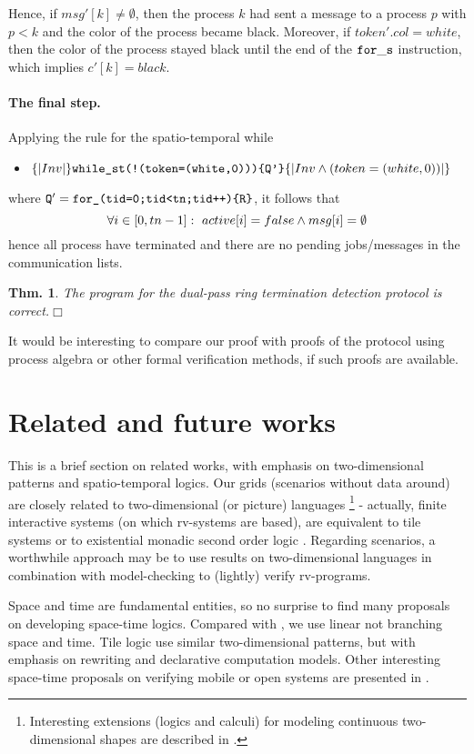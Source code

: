\documentclass[runningheads]{llncs}
\newcommand{\1}{\u{a}}
\newcommand{\2}{\c{s}}
\newcommand{\5}{\c{t}}
\newcommand{\8}{\^{\i}}
\newcommand{\9}{\^{a}}
\newtheorem{theorem}{Theorem}[section]
\newtheorem{theorem}{Thm.}[section]
\newcommand{\bthm}{\begin{theorem}}
\newcommand{\ethm}{\end{theorem}}
\newcommand{\snvsp}{\vspace{-1ex}}
\newcommand{\bi}{\begin{itemize}}
\newcommand{\ei}{\end{itemize}}
\newcommand{\foo}[1]{\footnote{#1}}
\newcommand{\co}{\,\colon\;}
\begin{document}
Hence, if $msg'[k]\not=\emptyset$, then the process $k$ had sent a message to a process $p$ with $p<k$ and the
color of the process became black. Moreover, if $token'.col=white$, then the color of the process stayed black
until the end of the ${\tt for\_s}$ instruction, which implies $c'[k]=black$.

\paragraph{The final step.}

Applying the rule for the spatio-temporal while \snvsp\bi
\item[]$\{|Inv|\}\mbox{\tt while\_st(!(token=(white,0)))\{Q'\}}\{|Inv \wedge (token=(white,0))|\}$\snvsp\ei
where ${\tt Q'= \mbox{\tt for\_(tid=0;tid<tn;tid++)\{R\}}}$, it follows that \snvsp$$\forall i\in[0,tn-1]\co
active[i]=false\wedge msg[i]=\emptyset\snvsp$$ hence all process have terminated and there are no pending
jobs/messages in the communication lists.

\bthm The program for the dual-pass ring termination detection protocol is
correct.\hfill{$\Box$}\ethm

It would be interesting to compare our proof with proofs of the protocol using process algebra or other formal
verification methods, if such proofs are available.

\section{Related and future works}\label{s7}

This is a brief section on related works, with emphasis on two-dimensional patterns and spatio-temporal
logics. Our grids (scenarios without data around) are closely related to two-dimensional (or picture) languages
\cite{gi-re97,lmn98}\foo{Interesting extensions (logics and calculi) for modeling continuous two-dimensional
  shapes are described in \cite{car08,sch04}.} - actually, finite interactive systems \cite{ste02} (on which
rv-systems are based), are equivalent to tile systems or to existential monadic second order logic
\cite{grst96}. Regarding scenarios, a worthwhile approach may be to use results on two-dimensional languages
in combination with model-checking to (lightly) verify rv-programs.

Space and time are fundamental entities, so no surprise to find many proposals on developing space-time
logics. Compared with \cite{ca-go00}, we use linear not branching space and time. Tile logic
\cite{bru99,ga-mo99} use similar two-dimensional patterns, but with emphasis on rewriting and declarative
computation models. Other interesting space-time proposals on verifying mobile or open systems are presented
in \cite{mwz03,va-ag01}.
\end{document}
